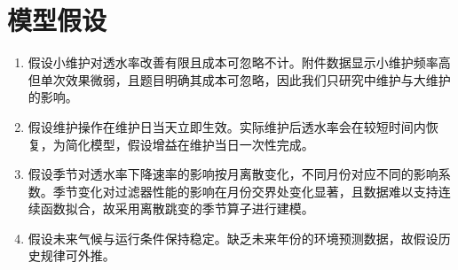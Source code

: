 \documentclass[withoutpreface,bwprint]{cumcmthesis}
\begin{document}

\section{模型假设}

\begin{enumerate}[label=\arabic*.]
	\item 假设小维护对透水率改善有限且成本可忽略不计。附件数据显示小维护频率高但单次效果微弱，且题目明确其成本可忽略，因此我们只研究中维护与大维护的影响。
	
	\item 假设维护操作在维护日当天立即生效。实际维护后透水率会在较短时间内恢复，为简化模型，假设增益在维护当日一次性完成。
	
	\item 假设季节对透水率下降速率的影响按月离散变化，不同月份对应不同的影响系数。季节变化对过滤器性能的影响在月份交界处变化显著，且数据难以支持连续函数拟合，故采用离散跳变的季节算子进行建模。
	
	\item 假设未来气候与运行条件保持稳定。缺乏未来年份的环境预测数据，故假设历史规律可外推。
\end{enumerate}

\end{document}
